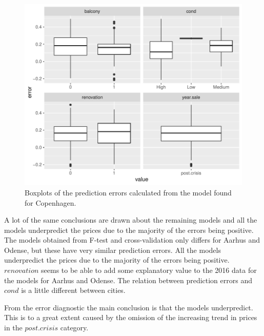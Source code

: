 \begin{figure}[H]
        \centering
      \includegraphics[width = 0.7 \textwidth]{figures/Nanna/errors_factors.pdf}
      \caption{Boxplots of the prediction errors calculated from the model found for Copenhagen.}
      \label{fig:error_factor}
\end{figure}
A lot of the same conclusions are drawn about the remaining models and all the models underpredict the prices due to the majority of the errors being positive.
The models obtained from F-test and cross-validation only differs for Aarhus and Odense, but these have very similar prediction errors.
All the models underpredict the prices due to the majority of the errors being positive.
$renovation$ seems to be able to add some explanatory value to the 2016 data for the models for Aarhus and Odense.  
The relation between prediction errors and $cond$ is a little different between cities. 

From the error diagnostic the main conclusion is that the models underpredict.
This is to a great extent caused by the omission of the increasing trend in prices in the $post.crisis$ category. 